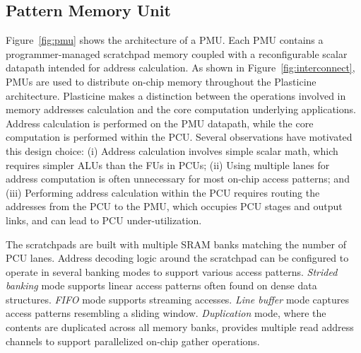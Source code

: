 \subsection{Pattern Memory Unit}
\label{ssec:PMU}
Figure~\ref{fig:pmu} shows the architecture of a PMU.
Each PMU contains a programmer-managed scratchpad memory coupled with a reconfigurable scalar datapath intended for address calculation.
As shown in Figure~\ref{fig:interconnect}, PMUs are used to distribute on-chip memory throughout the Plasticine architecture.
Plasticine makes a distinction between the operations involved in memory addresses calculation and the core computation
underlying applications. Address calculation is performed on the PMU datapath, while the core computation is performed within the PCU.
Several observations have motivated this design choice:
(i)  Address calculation involves simple scalar math, which requires simpler ALUs than the FUs in PCUs;
(ii) Using multiple lanes for address computation is often unnecessary for most on-chip access patterns; and
(iii) Performing address calculation within the PCU requires routing the addresses from the PCU to the PMU, which occupies PCU stages
     and output links, and can lead to PCU under-utilization.



The scratchpads are built with multiple SRAM banks matching the number of PCU lanes. Address decoding logic around the scratchpad
can be configured to operate in several banking modes to support various access patterns. \emph{Strided banking} mode supports
linear access patterns often found on dense data structures. \emph{FIFO} mode supports streaming accesses. \emph{Line buffer}
mode captures access patterns resembling a sliding window. \emph{Duplication} mode, where the contents are duplicated across all
memory banks, provides multiple read address channels to support parallelized on-chip gather operations.

